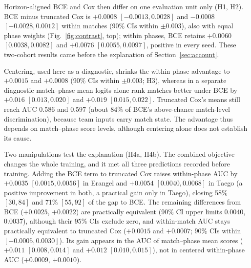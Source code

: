 \documentclass[sigconf,anonymous,nonacm]{acmart}
\begin{document}
Horizon-aligned BCE and Cox then differ on one evaluation unit only (H1, H2). BCE minus truncated Cox is $+0.0008$ $[-0.0013,\allowbreak 0.0028]$ and $-0.0008$ $[-0.0028,\allowbreak 0.0012]$ within matches (90\% CIs within $\pm0.003$), also with equal phase weights (Fig.~\ref{fig:contrast}, top); within phases, BCE retains $+0.0060$ $[0.0038,\allowbreak 0.0082]$ and $+0.0076$ $[0.0055,\allowbreak 0.0097]$, positive in every seed. These two-cohort results came before the explanation of Section~\ref{sec:account}.

Centering, used here as a diagnostic, shrinks the within-phase advantage to $+0.0015$ and $+0.0008$ (90\% CIs within $\pm0.003$; H3), whereas in a separate diagnostic match--phase mean logits alone rank matches better under BCE by $+0.016$ $[0.013,\allowbreak 0.020]$ and $+0.019$ $[0.015,\allowbreak 0.022]$. Truncated Cox's means still reach AUC 0.586 and 0.597 (about 84\% of BCE's above-chance match-level discrimination), because team inputs carry match state. The advantage thus depends on match--phase score levels, although centering alone does not establish its cause.

Two manipulations test the explanation (H4a, H4b). The combined objective changes the whole training, and it met all three predictions recorded before training. Adding the BCE term to truncated Cox raises within-phase AUC by $+0.0035$ $[0.0015,\allowbreak 0.0056]$ in Erangel and $+0.0054$ $[0.0040,\allowbreak 0.0068]$ in Taego (a positive improvement in both, a practical gain only in Taego), closing 58\% $[30,\allowbreak 84]$ and 71\% $[55,\allowbreak 92]$ of the gap to BCE. The remaining differences from BCE ($+0.0025$, $+0.0022$) are practically equivalent (90\% CI upper limits 0.0040, 0.0037), although their 95\% CIs exclude zero, and within-match AUC stays practically equivalent to truncated Cox ($+0.0015$ and $+0.0007$; 90\% CIs within $[-0.0005,\allowbreak 0.0030]$). Its gain appears in the AUC of match--phase mean scores ($+0.011$ $[0.008,\allowbreak 0.014]$ and $+0.012$ $[0.010,\allowbreak 0.015]$), not in centered within-phase AUC ($+0.0009$, $+0.0010$). 
\end{document}
